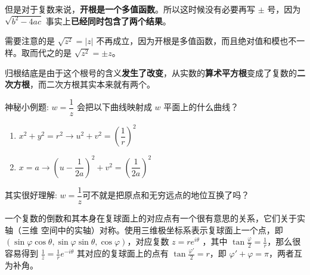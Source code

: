 但是对于复数来说，\textbf{开根是一个多值函数}。所以这时候没有必要再写 \(\pm\) 号，因为
\(\sqrt{b^2-4ac}\) 事实上\textbf{已经同时包含了两个结果}。

需要注意的是 \(\sqrt{z^2}=|z|\) 不再成立，因为开根是多值函数，而且绝对值和模也不一样。取而代之的是 \(\sqrt{z^2}=\pm z\)。

\begin{tcolorbox}[title={Note},colback=red!5!white
,colframe=red!75!black
,colbacktitle=yellow!50!red
,coltitle=red!25!black, fonttitle=\bfseries,subtitle style={boxrule=0.4pt, colback=yellow!50!red!25!white}]
归根结底是由于这个根号的含义\textbf{发生了改变}，从实数的\textbf{算术平方根}变成了复数的\textbf{二次方根}，而二次方根其实本来就有两个。

\end{tcolorbox}

神秘小例题: \(w=\dfrac{1}{z}\) 会把以下曲线映射成 \(w\) 平面上的什么曲线？

\begin{enumerate}
\item \(x^2+y^2=r^2 \to u^2+v^2=(\dfrac{1}{r})^2\)
\item \(x=a \to (u-\dfrac{1}{2a})^2+v^2=(\dfrac{1}{2a})^2\)
\end{enumerate}

\begin{tcolorbox}[title={Note},colback=red!5!white
,colframe=red!75!black
,colbacktitle=yellow!50!red
,coltitle=red!25!black, fonttitle=\bfseries,subtitle style={boxrule=0.4pt, colback=yellow!50!red!25!white}]
其实很好理解: \(w=\dfrac{1}{z}\)可不就是把原点和无穷远点的地位互换了吗？

一个复数的倒数和其本身在复球面上的对应点有一个很有意思的关系，它们关于实轴（三维
空间中的实轴）对称。使用三维极坐标系表示复球面上一个点，即
\((\sin\varphi\cos\theta, \sin\varphi\sin\theta, \cos\varphi)\)，对应复数 \(z = r e^{i\theta}\) ，其中 \(\tan\frac{\varphi}{2} = \frac{1}{r}\)，那么很容易得到
\(\frac{1}{z} = \frac{1}{r} e^{-i\theta}\) 其对应的复球面上的点有 \(\tan\frac{\varphi'}{2} = r\)，即 \(\varphi' + \varphi = \pi\)，两者互为补角。

\end{tcolorbox}
